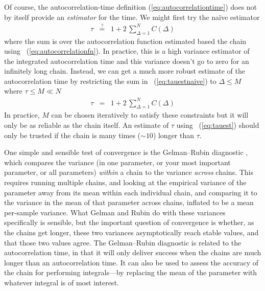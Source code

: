 \documentclass[12pt,twoside,pdftex]{article}
\begin{document}
Of course, the autocorrelation-time definition
(\ref{eq:autocorrelationtime}) does not by itself provide an
\emph{estimator} for the time.
We might first try the na\"ive estimator
\begin{eqnarray}\label{eq:tauestnaive}
\tau &\stackrel{?}{=}& 1 + 2\,\sum_{\Delta = 1}^{N} C(\Delta)
\end{eqnarray}
where the sum is over the autocorrelation function estimated based the chain
using \equationname~(\ref{eq:autocorrelationfn}).
In practice, this is a high variance estimator of the integrated
autocorrelation time and this variance doesn't go to zero for an infinitely
long chain.
Instead, we can get a much more robust estimate of the autocorrelation time by
restricting the sum in \equationname~(\ref{eq:tauestnaive}) to $\Delta \le M$
where
$\tau \le M \ll N$
\begin{eqnarray}\label{eq:tauest}
\tau &=& 1 + 2\,\sum_{\Delta = 1}^{N} C(\Delta)
\end{eqnarray}
In practice, $M$ can be chosen iteratively to satisfy these constraints but it
will only be as reliable as the chain itself.
An estimate of $\tau$ using \equationname~(\ref{eq:tauest}) should only be
trusted if the chain is many times ($\sim 10$) longer than $\tau$.

One simple and sensible test of convergence is the Gelman--Rubin
diagnostic , which compares the variance
(in one parameter, or your most important parameter, or all
parameters) \emph{within} a chain to the variance \emph{across}
chains.
This requires running multiple chains, and looking at the empirical
variance of the parameter away from its mean within each individual
chain, and comparing it to the variance in the mean of that parameter
across chains, inflated to be a mean per-sample variance.
What Gelman and Rubin do with these variances specifically is
sensible, but the important question of convergence is whether, as the
chains get longer, these two variances asymptotically reach stable
values, and that those two values agree.
The Gelman--Rubin diagnostic is related to the autocorrelation time,
in that it will only deliver success when the chains are much longer
than an autocorrelation time.
It can also be used to assess the accuracy of the chain for performing
integrals---by replacing the mean of the parameter with whatever
integral is of most interest.
\end{document}
